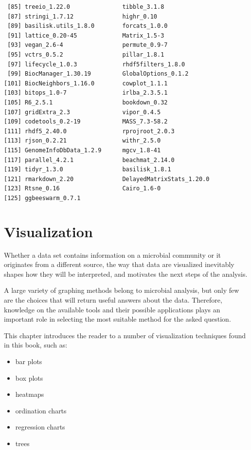 \documentclass[
]{book}
\providecommand{\tightlist}{%
  \setlength{\itemsep}{0pt}\setlength{\parskip}{0pt}}
\begin{document}
\begin{verbatim}
 [85] treeio_1.22.0               tibble_3.1.8               
 [87] stringi_1.7.12              highr_0.10                 
 [89] basilisk.utils_1.8.0        forcats_1.0.0              
 [91] lattice_0.20-45             Matrix_1.5-3               
 [93] vegan_2.6-4                 permute_0.9-7              
 [95] vctrs_0.5.2                 pillar_1.8.1               
 [97] lifecycle_1.0.3             rhdf5filters_1.8.0         
 [99] BiocManager_1.30.19         GlobalOptions_0.1.2        
[101] BiocNeighbors_1.16.0        cowplot_1.1.1              
[103] bitops_1.0-7                irlba_2.3.5.1              
[105] R6_2.5.1                    bookdown_0.32              
[107] gridExtra_2.3               vipor_0.4.5                
[109] codetools_0.2-19            MASS_7.3-58.2              
[111] rhdf5_2.40.0                rprojroot_2.0.3            
[113] rjson_0.2.21                withr_2.5.0                
[115] GenomeInfoDbData_1.2.9      mgcv_1.8-41                
[117] parallel_4.2.1              beachmat_2.14.0            
[119] tidyr_1.3.0                 basilisk_1.8.1             
[121] rmarkdown_2.20              DelayedMatrixStats_1.20.0  
[123] Rtsne_0.16                  Cairo_1.6-0                
[125] ggbeeswarm_0.7.1           
\end{verbatim}

\hypertarget{viz-chapter}{%
\chapter{Visualization}\label{viz-chapter}}

Whether a data set contains information on a microbial community or it originates from a different source, the way that data are visualized inevitably shapes how they will be interpreted, and motivates the next steps of the analysis.

A large variety of graphing methods belong to microbial analysis, but only few are the choices that will return useful answers about the data. Therefore, knowledge on the available tools and their possible applications plays an important role in selecting the most suitable method for the asked question.

This chapter introduces the reader to a number of visualization techniques found in this book, such as:

\begin{itemize}
\tightlist
\item
  bar plots
\item
  box plots
\item
  heatmaps
\item
  ordination charts
\item
  regression charts
\item
  trees
\end{itemize}
\end{document}

